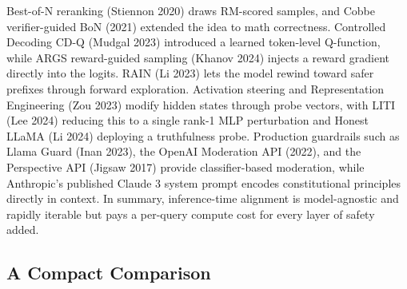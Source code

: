 Best-of-N reranking (Stiennon 2020) draws RM-scored samples, and Cobbe verifier-guided BoN (2021) extended the idea to math correctness. Controlled Decoding CD-Q (Mudgal 2023) introduced a learned token-level Q-function, while ARGS reward-guided sampling (Khanov 2024) injects a reward gradient directly into the logits. RAIN (Li 2023) lets the model rewind toward safer prefixes through forward exploration. Activation steering and Representation Engineering (Zou 2023) modify hidden states through probe vectors, with LITI (Lee 2024) reducing this to a single rank-1 MLP perturbation and Honest LLaMA (Li 2024) deploying a truthfulness probe. Production guardrails such as Llama Guard (Inan 2023), the OpenAI Moderation API (2022), and the Perspective API (Jigsaw 2017) provide classifier-based moderation, while Anthropic's published Claude 3 system prompt encodes constitutional principles directly in context. In summary, inference-time alignment is model-agnostic and rapidly iterable but pays a per-query compute cost for every layer of safety added.

\subsection{A Compact Comparison}\label{a-compact-comparison}

